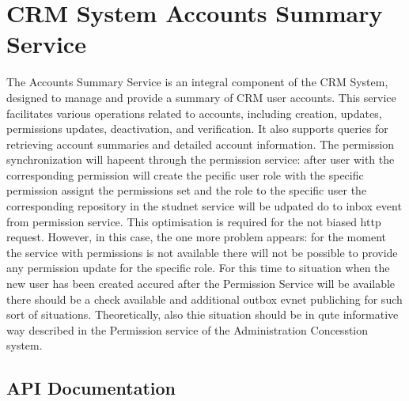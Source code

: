 \documentclass[letterpaper,10pt,english]{sphinxmanual}
\begin{document}
\section{CRM System Accounts Summary Service}
\label{\detokenize{crm_system/accounts_summary_service:crm-system-accounts-summary-service}}\label{\detokenize{crm_system/accounts_summary_service::doc}}
\sphinxAtStartPar
The Accounts Summary Service is an integral component of the CRM System, designed to manage and provide a summary of CRM user accounts. This service facilitates various operations related to accounts, including creation, updates, permissions updates, deactivation, and verification. It also supports queries for retrieving account summaries and detailed account information.
The permission synchronization will hapeent through the permission service: after user with the corresponding permission will create the pecific user role with the specific permission assignt the permissions set and the role to the specific user the corresponding repository in the studnet service will be udpated do to inbox event from permission service. This optimisation is required for the not biased http request. However, in this case, the one more problem appears: for the moment the service with permissions is not available there will not be possible to provide any permission update for the specific role. For this time to situation when the new user has been created accured after the Permission Service will be available there should be a check available and additional outbox evnet publiching for such sort of situations. Theoretically, also thie situation should be in qute informative way described in the Permission service of the Administration Concesstion system.



\subsection{API Documentation}
\label{\detokenize{crm_system/accounts_summary_service:api-documentation}}
\end{document}
